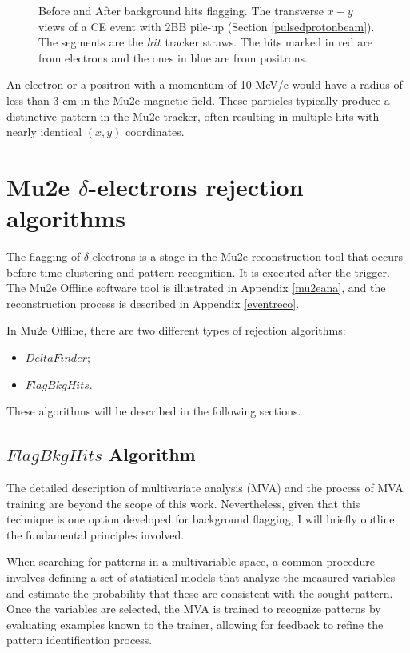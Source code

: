 \begin{figure}[!h]
\begin{subfigure}[b]{0.7\linewidth}
        \label{fig:af}
    \end{subfigure}
    \label{fig:afbef} 
    \caption{Before and After background hits flagging. The transverse $x-y$ views of a CE 
    event with 2BB pile-up (Section \ref{pulsedprotonbeam}). The segments are the $hit$ tracker straws. The hits marked in
    red are from electrons and the ones in blue are from positrons.}
\end{figure}



An electron or a positron with a momentum of 10 MeV/c would have a radius of less than 3 cm in the 
Mu2e magnetic field. These particles typically produce a distinctive pattern in the 
Mu2e tracker, often resulting in multiple hits with nearly identical $(x, y)$ coordinates.

\section{Mu2e $\delta$-electrons rejection algorithms}
The flagging of $\delta$-electrons is a stage in the Mu2e reconstruction 
tool that occurs before time clustering and pattern recognition. 
It is executed after the trigger. The Mu2e Offline software tool is 
illustrated in Appendix \ref{mu2eana}, and the reconstruction process is described in Appendix \ref{eventreco}. 

In Mu2e Offline, there are two different types of rejection algorithms:
\begin{itemize}
    \item $DeltaFinder$;
    \item $FlagBkgHits$.
\end{itemize}
These algorithms will be described in the following sections.
\subsection{$FlagBkgHits$ Algorithm}
The detailed description of multivariate analysis (MVA) and the process of MVA 
training are beyond the scope of this work. Nevertheless, given that this 
technique is one option developed for background flagging, I will briefly outline the 
fundamental principles involved.

When searching for patterns in a multivariable space, a common procedure involves 
defining a set of statistical models that analyze the measured variables and estimate 
the probability that these are consistent with the sought pattern. Once the variables 
are selected, the MVA is trained to recognize patterns by evaluating examples known 
to the trainer, allowing for feedback to refine the pattern identification process.

